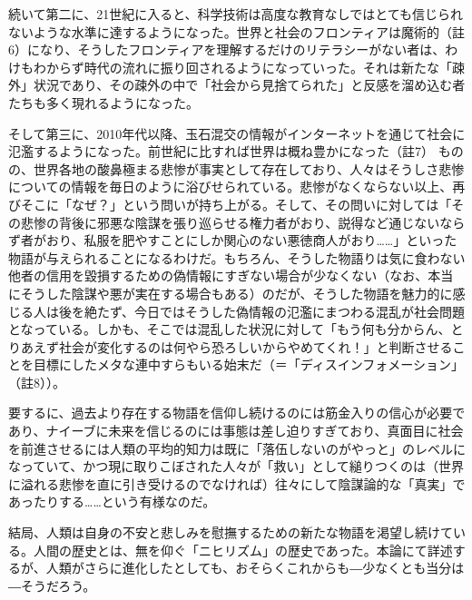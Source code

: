 続いて第二に、21世紀に入ると、科学技術は高度な教育なしではとても信じられないような水準に達するようになった。世界と社会のフロンティアは魔術的（註6）になり、そうしたフロンティアを理解するだけのリテラシーがない者は、わけもわからず時代の流れに振り回されるようになっていった。それは新たな「疎外」状況であり、その疎外の中で「社会から見捨てられた」と反感を溜め込む者たちも多く現れるようになった。

そして第三に、2010年代以降、玉石混交の情報がインターネットを通じて社会に氾濫するようになった。前世紀に比すれば世界は概ね豊かになった（註7）
ものの、世界各地の酸鼻極まる悲惨が事実として存在しており、人々はそうしさ悲惨についての情報を毎日のように浴びせられている。悲惨がなくならない以上、再びそこに「なぜ？」という問いが持ち上がる。そして、その問いに対しては「その悲惨の背後に邪悪な陰謀を張り巡らせる権力者がおり、説得など通じないならず者がおり、私服を肥やすことにしか関心のない悪徳商人がおり\ldots\ldots」といった物語が与えられることになるわけだ。もちろん、そうした物語りは気に食わない他者の信用を毀損するための偽情報にすぎない場合が少なくない（なお、本当にそうした陰謀や悪が実在する場合もある）のだが、そうした物語を魅力的に感じる人は後を絶たず、今日ではそうした偽情報の氾濫にまつわる混乱が社会問題となっている。しかも、そこでは混乱した状況に対して「もう何も分からん、とりあえず社会が変化するのは何やら恐ろしいからやめてくれ！」と判断させることを目標にしたメタな連中すらもいる始末だ（＝「ディスインフォメーション」（註8））。

要するに、過去より存在する物語を信仰し続けるのには筋金入りの信心が必要であり、ナイーブに未来を信じるのには事態は差し迫りすぎており、真面目に社会を前進させるには人類の平均的知力は既に「落伍しないのがやっと」のレベルになっていて、かつ現に取りこぼされた人々が「救い」として縋りつくのは（世界に溢れる悲惨を直に引き受けるのでなければ）往々にして陰謀論的な「真実」であったりする\ldots\ldots という有様なのだ。

結局、人類は自身の不安と悲しみを慰撫するための新たな物語を渇望し続けている。人間の歴史とは、無を仰ぐ「ニヒリズム」の歴史であった。本論にて詳述するが、人類がさらに進化したとしても、おそらくこれからも―少なくとも当分は―そうだろう。

